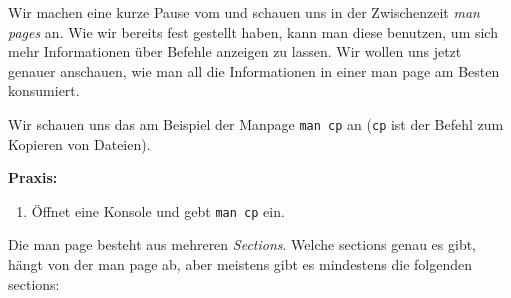 
Wir machen eine kurze Pause vom \Cpp und schauen uns in der Zwischenzeit
\emph{man pages} an. Wie wir bereits fest gestellt haben, kann man diese
benutzen, um sich mehr Informationen über Befehle anzeigen zu lassen. Wir
wollen uns jetzt genauer anschauen, wie man all die Informationen in einer man
page am Besten konsumiert.

Wir schauen uns das am Beispiel der Manpage \texttt{man cp} an (\texttt{cp} ist
der Befehl zum Kopieren von Dateien).

\textbf{Praxis:}
\begin{enumerate}
    \item Öffnet eine Konsole und gebt \texttt{man cp} ein.
\end{enumerate}

Die man page besteht aus mehreren \emph{Sections}. Welche sections genau es
gibt, hängt von der man page ab, aber meistens gibt es mindestens die folgenden
sections:

